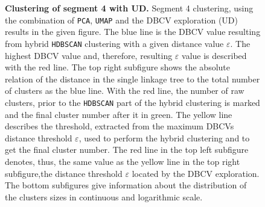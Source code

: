 \begin{figure}[!htb]
\begin{subfigure}[b]{0.475\textwidth}
    \end{subfigure}
    \caption[Clustering of segment 4 with UD]{\textbf{Clustering of segment 4 with UD.} Segment 4 clustering, using the combination of \texttt{PCA}, \texttt{UMAP} and the \gls{DBCV} exploration (UD) results in the given figure. The blue line is the \gls{DBCV} value resulting from hybrid \texttt{HDBSCAN} clustering with a given distance value $\varepsilon$. The highest \gls{DBCV} value and, therefore, resulting $\varepsilon$ value is described with the red line. The top right subfigure shows the absolute relation of the distance in the single linkage tree to the total number of clusters as the blue line. With the red line, the number of raw clusters, prior to the \texttt{HDBSCAN} part of the hybrid clustering is marked and the final cluster number after it in green. The yellow line describes the threshold, extracted from the maximum \glspl{DBCV} distance threshold $\varepsilon$, used to perform the hybrid clustering and to get the final cluster number. The red line in the top left subfigure denotes, thus, the same value as the yellow line in the top right subfigure,the distance threshold $\varepsilon$ located by the \gls{DBCV} exploration. The bottom subfigures give information about the distribution of the clusters sizes in continuous and logarithmic scale.}
    \label{fig:UMAP_Cluster_DBCV_4}
\end{figure}

\FloatBarrier
\newpage

